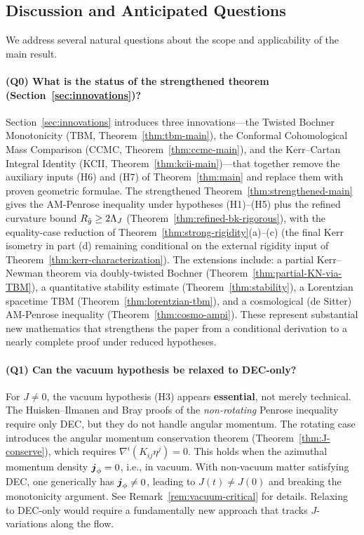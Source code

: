 \subsection*{Discussion and Anticipated Questions}

We address several natural questions about the scope and applicability of the main result.

\paragraph{(Q0) What is the status of the strengthened theorem (Section~\ref{sec:innovations})?}
Section~\ref{sec:innovations} introduces three innovations---the Twisted Bochner Monotonicity (TBM, Theorem~\ref{thm:tbm-main}), the Conformal Cohomological Mass Comparison (CCMC, Theorem~\ref{thm:ccmc-main}), and the Kerr--Cartan Integral Identity (KCII, Theorem~\ref{thm:kcii-main})---that together remove the auxiliary inputs (H6) and (H7) of Theorem~\ref{thm:main} and replace them with proven geometric formulae. The strengthened Theorem~\ref{thm:strengthened-main} gives the AM-Penrose inequality under hypotheses (H1)--(H5) plus the refined curvature bound $R_{\bar{g}} \geq 2\Lambda_J$ (Theorem~\ref{thm:refined-bk-rigorous}), with the equality-case reduction of Theorem~\ref{thm:strong-rigidity}(a)--(c) (the final Kerr isometry in part (d) remaining conditional on the external rigidity input of Theorem~\ref{thm:kerr-characterization}). The extensions include: a partial Kerr--Newman theorem via doubly-twisted Bochner (Theorem~\ref{thm:partial-KN-via-TBM}), a quantitative stability estimate (Theorem~\ref{thm:stability}), a Lorentzian spacetime TBM (Theorem~\ref{thm:lorentzian-tbm}), and a cosmological (de Sitter) AM-Penrose inequality (Theorem~\ref{thm:cosmo-ampi}). These represent substantial new mathematics that strengthens the paper from a conditional derivation to a nearly complete proof under reduced hypotheses.

\paragraph{(Q1) Can the vacuum hypothesis be relaxed to DEC-only?}
For $J \neq 0$, the vacuum hypothesis (H3) appears \textbf{essential}, not merely technical. The Huisken--Ilmanen and Bray proofs of the \emph{non-rotating} Penrose inequality require only DEC, but they do not handle angular momentum. The rotating case introduces the angular momentum conservation theorem (Theorem~\ref{thm:J-conserve}), which requires $\nabla^i(K_{ij}\eta^j) = 0$. This holds when the azimuthal momentum density $\boldsymbol{j}_\phi = 0$, i.e., in vacuum. With non-vacuum matter satisfying DEC, one generically has $\boldsymbol{j}_\phi \neq 0$, leading to $J(t) \neq J(0)$ and breaking the monotonicity argument. See Remark~\ref{rem:vacuum-critical} for details. Relaxing to DEC-only would require a fundamentally new approach that tracks $J$-variations along the flow.

